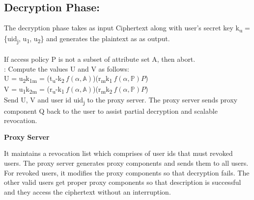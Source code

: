 \documentclass[conference]{IEEEtran}
\begin{document}
{\begin{itemize}
\end{itemize}



\subsection{\textbf {Decryption Phase: }}

The decryption phase takes as input Ciphertext along with user's secret key k\textsubscript{u} = \{uid\textsubscript{j}, u\textsubscript{1}, u\textsubscript{2}\} and generates the plaintext as as output. \\
{\color{red}{Change the following to itemize and equations}} \\
 If access policy P is not a subset of attribute set A, then abort.\\

 : Compute the values U and V as follows:\\

U = u\textsubscript{2}k\textsubscript{1m} = (t\textsubscript{u}-k\textsubscript{2}$\ f(\alpha,\mathbb{A})$)(r\textsubscript{m}k\textsubscript{1}$\ f(\alpha,\mathbb{P})P$)\\

V = u\textsubscript{1}k\textsubscript{2m} = (r\textsubscript{u}-k\textsubscript{1}$\ f(\alpha,\mathbb{A})$)(r\textsubscript{m}k\textsubscript{2}$\ f(\alpha,\mathbb{P})P$)\\

Send U, V and user id uid\textsubscript{j} to the proxy server. The proxy server sends proxy component Q back to the user to assist partial decryption and scalable revocation. \\

\par \textbf {Proxy Server }
\par It maintains a revocation list which comprises of user ids that must revoked users. The proxy server generates proxy components and sends them to all users. For revoked users, it modifies the proxy components so that decryption fails. The other valid users get proper proxy components so that description is successful and they access the ciphertext without an interruption.

}
\end{document}
